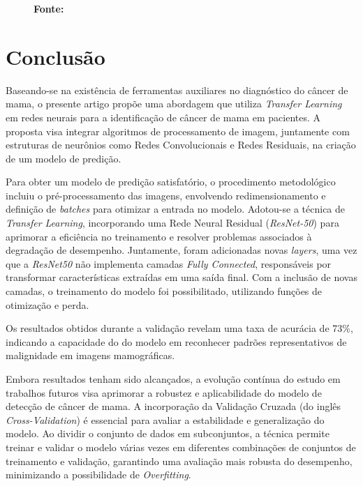 \begin{figure}[ht]
\begin{minipage}[b]{0.45\textwidth}
        \label{fig:predicao_com}
        \textbf{\footnotesize Fonte: \href{https://www.kaggle.com/datasets/awsaf49/cbis-ddsm-breast-cancer-image-dataset}{\cite{newdatabase}}}
    \end{minipage}
\end{figure}




\section{\esp Conclusão} \label{conclusion}
Baseando-se na existência de ferramentas auxiliares no diagnóstico do câncer de mama, o presente artigo propõe uma abordagem que utiliza \textit{Transfer Learning} em redes neurais para a identificação de câncer de mama em pacientes. A proposta visa integrar algoritmos de processamento de imagem, juntamente com estruturas de neurônios como Redes Convolucionais e Redes Residuais, na criação de um modelo de predição. 

Para obter um modelo de predição satisfatório, o procedimento metodológico incluiu o pré-processamento das imagens, envolvendo redimensionamento e definição de \textit{batches} para otimizar a entrada no modelo. Adotou-se a técnica de \textit{Transfer Learning}, incorporando uma Rede Neural Residual (\textit{ResNet-50}) para aprimorar a eficiência no treinamento e resolver problemas associados à degradação de desempenho. Juntamente, foram adicionadas novas \textit{layers}, uma vez que a \textit{ResNet50} não implementa camadas \textit{Fully Connected}, responsáveis por transformar características extraídas em uma saída final. Com a inclusão de novas camadas, o treinamento do modelo foi possibilitado, utilizando funções de otimização e perda.

Os resultados obtidos durante a validação revelam uma taxa de acurácia de 73\%, indicando a capacidade do do modelo em reconhecer padrões representativos de malignidade em imagens mamográficas. 


Embora resultados tenham sido alcançados, a evolução contínua do estudo em trabalhos futuros visa aprimorar a robustez e aplicabilidade do modelo de detecção de câncer de mama. A incorporação da Validação Cruzada (do inglês \textit{Cross-Validation}) é essencial para avaliar a estabilidade e generalização do modelo. Ao dividir o conjunto de dados em subconjuntos, a técnica permite treinar e validar o modelo várias vezes em diferentes combinações de conjuntos de treinamento e validação, garantindo uma avaliação mais robusta do desempenho, minimizando a possibilidade de \textit{Overfitting}.

